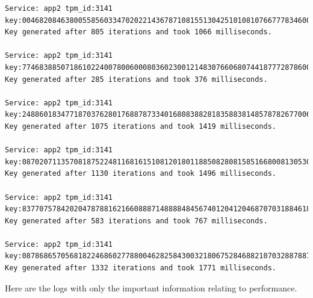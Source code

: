 \begin{lstlisting}
Service: app2 tpm_id:3141 key:004682084638005585603347020221436787108155130425101081076677783460007047
Key generated after 805 iterations and took 1066 milliseconds.

Service: app2 tpm_id:3141 key:774683885071861022400780060008036023001214830766068074418777287860010113
Key generated after 285 iterations and took 376 milliseconds.

Service: app2 tpm_id:3141 key:248860183477187037628017688787334016808388281835883814857878267700683471
Key generated after 1075 iterations and took 1419 milliseconds.

Service: app2 tpm_id:3141 key:087020711357081875224811681615108120180118850828081585166800813053008617
Key generated after 1130 iterations and took 1496 milliseconds.

Service: app2 tpm_id:3141 key:837707578420204787881621660888714888848456740120412046870703188461812188
Key generated after 583 iterations and took 767 milliseconds.

Service: app2 tpm_id:3141 key:087868657056818224686027788004628258430032180675284688210703288788788008
Key generated after 1332 iterations and took 1771 milliseconds.

\end{lstlisting}

Here are the logs with only the important information relating to performance.

